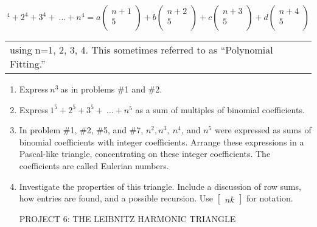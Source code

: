 \documentclass[10pt,letter]{article}
\renewenvironment{quote}
  {\begin{tabular}{|p{13cm}}}
  {\end{tabular}}
\begin{document}
\[
^{4} + 2^{4} + 3^{4} + \ \ldots + n^{4} = a\begin{pmatrix}
n + 1 \\
5 \\
\end{pmatrix} + b\begin{pmatrix}
n + 2 \\
5 \\
\end{pmatrix} + c\begin{pmatrix}
n + 3 \\
5 \\
\end{pmatrix} + d\begin{pmatrix}
n + 4 \\
5 \\
\end{pmatrix}
\]
\begin{quote}
using n=1, 2, 3, 4. This sometimes referred to as ``Polynomial
Fitting.''

\end{quote}
\begin{enumerate}
\def\labelenumi{\arabic{enumi}.}

\item
  Express\(\ n^{3}\ \)as in problems \#1 and \#2.
\item
  Express\(\ 1^{5} + 2^{5} + 3^{5} + \ \ldots + n^{5}\) as a sum of
  multiples of binomial coefficients.
\item
  In problem \#1, \#2, \#5, and \#7, \(n^{2},n^{3},\ n^{4},\ \)and
  \(n^{5}\) were expressed as sums of binomial coefficients with integer
  coefficients. Arrange these expressions in a Pascal-like triangle,
  concentrating on these integer coefficients. The coefficients are
  called Eulerian numbers.
\item
  Investigate the properties of this triangle. Include a discussion of
  row sums, how entries are found, and a possible recursion. Use
  \(\begin{bmatrix}
  n
  k
  \end{bmatrix}
\) for notation.

PROJECT 6: THE LEIBNITZ HARMONIC TRIANGLE

\end{enumerate}
\end{document}
